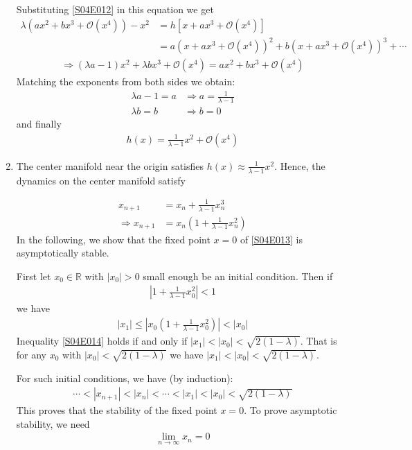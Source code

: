 \begin{solution}[4.1]
\begin{enumerate}
Substituting \eqref{S04E012} in this equation we get
\begin{align}
	\lambda(ax^2 + bx^3 + \mathcal{O}(x^4)) - x^2 &= h[x + ax^3 + \mathcal{O}(x^4)] \\
	&= a(x + ax^3 + \mathcal{O}(x^4))^2 + b(x + ax^3 + \mathcal{O}(x^4))^3 + \cdots
\end{align}
\begin{align}
	\Longrightarrow (\lambda a - 1)x^2 + \lambda b x^3 + \mathcal{O}(x^4) = ax^2 + bx^3 + \mathcal{O}(x^4)
\end{align}
Matching the exponents from both sides we obtain:
\begin{align}
	\lambda a - 1 = a &\Longrightarrow a = \frac{1}{\lambda - 1} \\
	\lambda b = b &\Longrightarrow b = 0
\end{align}
and finally
\begin{align}
	\boxed{
		h(x) = \frac{1}{\lambda - 1}x^2 + \mathcal{O}(x^4)	
	}
\end{align}


\item The center manifold near the origin satisfies $h(x) \approx \frac{1}{\lambda - 1}x^2$.
Hence, the dynamics on the center manifold satisfy

\begin{align}
	x_{n+1} &= x_n + \frac{1}{\lambda - 1}x_n^3 \nonumber \\
	\Longrightarrow x_{n+1} &= x_n \left( 1 + \frac{1}{\lambda - 1}x_n^2 \right) \label{S04E013}
\end{align}
In the following, we show that the fixed point $x=0$ of \eqref{S04E013} is asymptotically stable. 

First let $x_0 \in \mathbb{R}$ with $|x_0|>0$ small enough be an initial condition. Then if
\begin{align}\label{S04E014}
	\left\vert 1 + \frac{1}{\lambda - 1}x_0^2 \right\vert < 1
\end{align}
we have
\begin{align}
	|x_1| \leq \left\vert x_0 \left( 1 + \frac{1}{\lambda - 1}x_0^2 \right) \right\vert < |x_0|
\end{align}
Inequality \eqref{S04E014} holds if and only if $|x_1| < |x_0| < \sqrt{2(1-\lambda)}$. That is for any $x_0$ with $|x_0|<\sqrt{2(1-\lambda)}$ we have $|x_1| < |x_0| < \sqrt{2(1-\lambda)}$.

For such initial conditions, we have (by induction):
\begin{align}\label{S04E015}
	\cdots < |x_{n+1}| < |x_n| < \cdots < |x_1| < |x_0| < \sqrt{2(1-\lambda)}
\end{align}
This proves that the stability of the fixed point $x=0$. To prove asymptotic stability, we need
\begin{align}
	\lim_{n \rightarrow \infty} x_n = 0
\end{align}


\end{enumerate}
\end{solution}
